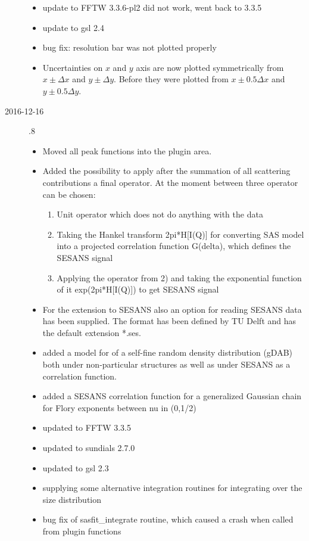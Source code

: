 \begin{description}
\begin{itemize}
    \item update to FFTW 3.3.6-pl2 did not work, went back to 3.3.5
    \item update to gsl 2.4
    \item bug fix: resolution bar was not plotted properly
    \item Uncertainties on $x$ and $y$ axis are now plotted symmetrically from $x\pm\Delta x$ and $y\pm\Delta y$.
          Before they were plotted from $x\pm0.5\Delta x$ and $y\pm0.5\Delta y$.
    \end{itemize}
\item[2016-12-16] .8
    \begin{itemize}
        \item Moved all peak functions into the plugin area.
        \item Added the possibility to apply after the summation of all scattering contributions a final operator.  At the moment between three operator can be chosen:
        \begin{enumerate}
            \item Unit operator which does not do anything with the data
            \item Taking the Hankel transform 2pi*H[I(Q)] for converting SAS model into a projected correlation function G(delta), which defines the SESANS signal
            \item Applying the operator from 2) and taking the exponential function of it exp(2pi*H[I(Q)]) to get SESANS signal
        \end{enumerate}
        \item For the extension to SESANS also an option for reading SESANS data has been supplied. The format has been defined by TU Delft and has the default extension *.ses.
        \item added a model for of a self-fine random density distribution (gDAB) both under non-particular  structures as well as under SESANS as a correlation function.
        \item added a SESANS correlation function for a generalized Gaussian chain for Flory exponents between nu in (0,1/2)
        \item updated to FFTW 3.3.5
        \item updated to sundials 2.7.0
        \item updated to gsl 2.3
        \item supplying some alternative integration routines for integrating over the size distribution
        \item bug fix of sasfit\_integrate routine, which caused a crash when called from plugin functions

\end{itemize}
\end{description}

